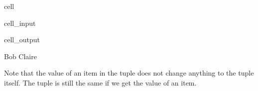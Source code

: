 \documentclass[letterpaper,10pt,english]{jupyterBook}
\begin{document}
\begin{sphinxuseclass}{cell}\begin{sphinxVerbatimInput}

\begin{sphinxuseclass}{cell_input}
\begin{sphinxVerbatim}[commandchars=\\\{\}]
\PYG{p}{[}\PYG{p}{]}
\PYG{p}{[}\PYG{p}{]}
\end{sphinxVerbatim}

\end{sphinxuseclass}\end{sphinxVerbatimInput}
\begin{sphinxVerbatimOutput}

\begin{sphinxuseclass}{cell_output}
\begin{sphinxVerbatim}[commandchars=\\\{\}]
Bob
Claire
\end{sphinxVerbatim}

\end{sphinxuseclass}\end{sphinxVerbatimOutput}

\end{sphinxuseclass}
\sphinxAtStartPar
Note that  the value of an item in the tuple does not change anything to the tuple itself. The tuple is still the same if we get the value of an item.
\end{document}
